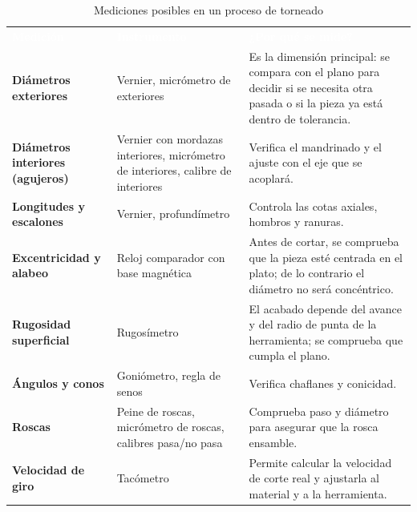 \documentclass[12pt,a4paper]{article}
\newcommand{\encab}[1]{\textcolor{white}{\sffamily\bfseries #1}}
\begin{document}
\begin{table}[!htb]
	\centering
	\caption{Mediciones posibles en un proceso de torneado}\label{tab:torneado}
	\small
	\begin{tabularx}{\linewidth}{>{\raggedright\arraybackslash\bfseries}p{3.2cm}
			>{\raggedright\arraybackslash}p{3.6cm} X}
		\rowcolor{darkblue}
		\encab{Medición}                                & \encab{Instrumento}
		                                                & \encab{¿Por qué se mide?}
		\\
		Diámetros exteriores                            & Vernier, micrómetro de
		exteriores                                      & Es la dimensión
		principal: se compara con el plano para decidir si se necesita otra pasada o
		si
		la pieza ya está dentro de tolerancia.
		\\
		Diámetros interiores (agujeros)                 & Vernier con mordazas
		interiores,
		micrómetro de interiores, calibre de interiores & Verifica el mandrinado y
		el
		ajuste con el eje que se acoplará.
		\\
		Longitudes y escalones                          & Vernier, profundímetro
		                                                & Controla las cotas
		axiales, hombros y ranuras.
		\\
		Excentricidad y alabeo                          & Reloj comparador con base
		magnética
		                                                & Antes de cortar, se
		comprueba que la pieza esté centrada en el plato; de lo
		contrario el diámetro no será concéntrico.
		\\
		Rugosidad superficial                           & Rugosímetro
		                                                & El acabado depende del
		avance y del radio
		de punta de la herramienta; se
		comprueba que cumpla el plano.
		\\
		Ángulos y conos                                 & Goniómetro, regla de senos
		                                                & Verifica chaflanes y
		conicidad.
		\\
		Roscas                                          & Peine de roscas,
		micrómetro de roscas,
		calibres pasa/no pasa                           & Comprueba paso y diámetro
		para
		asegurar que la rosca ensamble.
		\\
		Velocidad de giro                               & Tacómetro
		                                                & Permite calcular la
		velocidad de corte real y ajustarla al material y a la
		herramienta.
		\\
	\end{tabularx}
\end{table}
\end{document}
